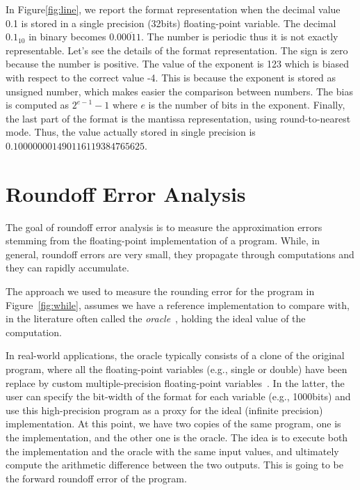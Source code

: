 In Figure\ref{fig:line}, we report the format representation when the decimal value 0.1 is stored in a single precision (32bits) floating-point variable.
%
The decimal $0.1_{10}$ in binary becomes $0.0\overline{0011}$.
%
The number is periodic thus it is not exactly representable.
%
Let's see the details of the format representation.
%
The sign is zero because the number is positive.
%
The value of the exponent is 123 which is biased with respect to the correct value -4.
%
This is because the exponent is stored as unsigned number, which makes easier the comparison between numbers.
%
The bias is computed as $2^{e-1}-1$ where $e$ is the number of bits in the exponent.
%
Finally, the last part of the format is the mantissa representation, using round-to-nearest mode.
%
Thus, the value actually stored in single precision is $0.100000001490116119384765625$.
\section{Roundoff Error Analysis}
%
The goal of roundoff error analysis is to measure the approximation errors stemming from the floating-point implementation of a program.
%
While, in general, roundoff errors are very small, they propagate through computations and they can rapidly accumulate.
%
%
%

The approach we used to measure the rounding error for the program in Figure~\ref{fig:while}, assumes we have a reference implementation to compare with, in the literature often called the \emph{oracle}~\cite{blame}, holding the ideal value of the computation.
%
% 

In real-world applications, the oracle typically consists of a clone of the original program, where all the floating-point variables (e.g., single or double) have been replace by custom multiple-precision floating-point variables~\cite{mpfr}.
%
In the latter, the user can specify the bit-width of the format for each variable (e.g., 1000bits) and use this high-precision program as a proxy for the ideal (infinite precision) implementation.
%
At this point, we have two copies of the same program, one is the implementation, and the other one is the oracle. 
%
The idea is to execute both the implementation and the oracle with the same input values, and ultimately compute the arithmetic difference between the two outputs. 
%
This is going to be the forward roundoff error of the program. 
%

